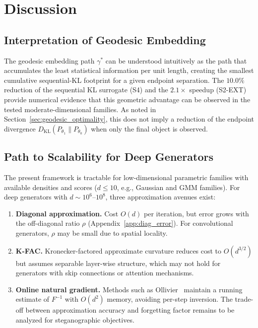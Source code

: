 \documentclass[a4paper,fleqn]{cas-dc}
\newcommand{\DKL}{D_{\mathrm{KL}}}
\begin{document}
\section{Discussion}
\label{sec:discussion}

\subsection{Interpretation of Geodesic Embedding}

The geodesic embedding path $\gamma^*$ can be understood intuitively as
the path that accumulates the least statistical information per unit
length, creating the smallest cumulative sequential-KL footprint for a
given endpoint separation.  The $10.0\%$ reduction of the sequential KL
surrogate (S4) and the $2.1\times$ speedup (S2-EXT) provide numerical
evidence that this geometric advantage can be observed in the tested
moderate-dimensional families.  As noted in Section~\ref{sec:geodesic_optimality},
this does not imply a reduction of the endpoint divergence
$\DKL(P_{\theta_1}\|P_{\theta_0})$ when only the final object is observed.

\subsection{Path to Scalability for Deep Generators}

The present framework is tractable for low-dimensional parametric families
with available densities and scores ($d \leq 10$, e.g., Gaussian and GMM
families).  For deep generators
with $d \sim 10^6$--$10^8$, three approximation avenues exist:

\begin{enumerate}
  \item \textbf{Diagonal approximation.}  Cost $O(d)$ per iteration,
        but error grows with the off-diagonal ratio $\rho$
        (Appendix~\ref{app:diag_error}).  For convolutional generators,
        $\rho$ may be small due to spatial locality.
  \item \textbf{K-FAC.}  Kronecker-factored approximate curvature
        reduces cost to $O(d^{3/2})$ but assumes separable layer-wise
        structure, which may not hold for generators with skip
        connections or attention mechanisms.
  \item \textbf{Online natural gradient.}  Methods such as
        Ollivier~\cite{ollivier2015riemannian} maintain a running estimate of $F^{-1}$ with
        $O(d^2)$ memory, avoiding per-step inversion.  The trade-off
        between approximation accuracy and forgetting factor remains
        to be analyzed for steganographic objectives.
\end{enumerate}
\end{document}
